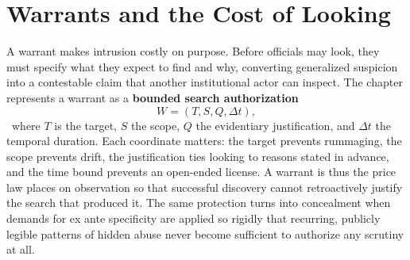 
\chapter{Warrants and the Cost of Looking}
\label{ch:ch042}

A warrant makes intrusion costly on purpose. Before officials may look, they must specify what they expect to find and why, converting generalized suspicion into a contestable claim that another institutional actor can inspect. The chapter represents a warrant as a \textbf{bounded search authorization}
\[
W=(T,S,Q,\Delta t),
\]
\Definition\ where \(T\) is the target, \(S\) the scope, \(Q\) the evidentiary justification, and \(\Delta t\) the temporal duration.
Each coordinate matters: the target prevents rummaging, the scope prevents drift, the justification ties looking to reasons stated in advance, and the time bound prevents an open-ended license. A warrant is thus the price law places on observation so that successful discovery cannot retroactively justify the search that produced it. The same protection turns into concealment when demands for ex ante specificity are applied so rigidly that recurring, publicly legible patterns of hidden abuse never become sufficient to authorize any scrutiny at all.
